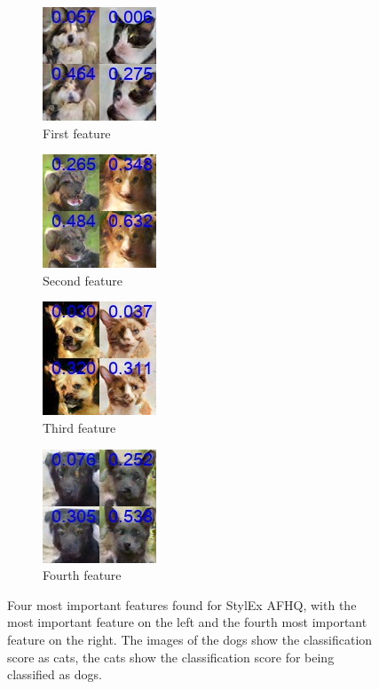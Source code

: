 \begin{figure}[H]
     \centering
     \begin{subfigure}[b]{0.24\textwidth}
     \centering
     \includegraphics[scale=0.55]{images/AFHQ_1.jpg}
     \caption{First feature}
     \label{fig:dc1}
     \end{subfigure}
     \hfill
     \begin{subfigure}[b]{0.24\textwidth}
     \centering
     \includegraphics[scale=0.55]{images/AFHQ_2.jpg}
     \caption{Second feature}
     \label{fig:dc2}
     \end{subfigure}
     \hfill
     \begin{subfigure}[b]{0.24\textwidth}
     \centering
     \includegraphics[scale=0.55]{images/AFHQ_3.jpg}
     \caption{Third feature}
     \label{fig:dc3}
     \end{subfigure}
     \hfill
     \begin{subfigure}[b]{0.24\textwidth}
     \centering
     \includegraphics[scale=0.55]{images/AFHQ_4.jpg}
     \caption{Fourth feature}
     \label{fig:dc4}
     \end{subfigure}
     \caption{Four most important features found for StylEx AFHQ, with the most important feature on the left and the fourth most important feature on the right. The images of the dogs show the classification score as cats, the cats show the classification score for being classified as dogs.}
     \label{fig:DC_feats}
\end{figure}
